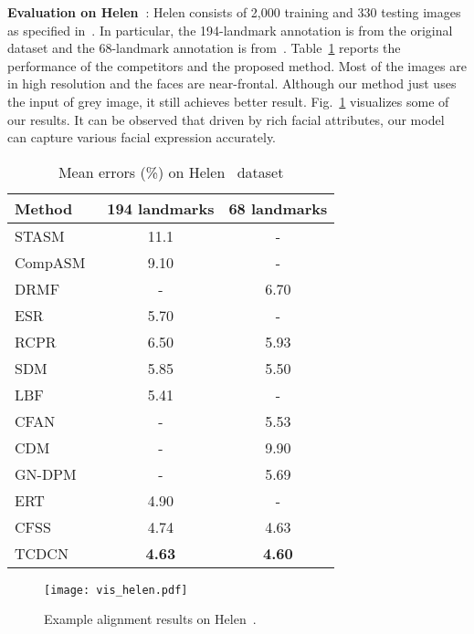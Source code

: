 \documentclass[10pt,journal,compsoc]{IEEEtran}
\begin{document}
\vspace{0.1cm}
\noindent\textbf{Evaluation on Helen~\cite{Helen}}: Helen consists of 2,000 training and 330 testing images as specified in~\cite{Helen}. In particular, the 194-landmark annotation is from the original dataset and the 68-landmark annotation is from~\cite{300w}. Table~\ref{tab:helen} reports the performance of the competitors and the proposed method. Most of the images are in high resolution and the faces are near-frontal. Although our method just uses the input of  grey image, it still achieves better result. Fig.~\ref{fig:visual_examples_helen} visualizes some of our results. It can be observed that driven by rich facial attributes, our model can capture various facial expression accurately.

\begin{table}[t]
\caption{Mean errors (\%) on Helen~\cite{Helen} dataset}
\vskip -0.5cm
\label{tab:helen}

\begin{center}
\begin{tabular}{l|c|c}
\hline
Method&194 landmarks&68 landmarks\\
\hline\hline
STASM~\cite{milborrow2008locating}&11.1&-\\
CompASM~\cite{Helen}&9.10&-\\
DRMF~\cite{asthana2013robust}&-&6.70\\
ESR~\cite{Cao2012}&5.70&-\\
RCPR~\cite{dollar13}&6.50&5.93\\
SDM~\cite{6618919}&5.85&5.50\\
LBF~\cite{300w_lbp}&5.41&-\\
CFAN~\cite{zhang2014coarse}&-&5.53\\
CDM~\cite{Yu2013}&-&9.90\\
GN-DPM~\cite{tzimiropoulos2014gauss}&-&5.69\\
ERT~\cite{kazemi2014one}&4.90&-\\
CFSS~\cite{zhu2015face}&4.74&4.63\\
TCDCN&\textbf{4.63}&\textbf{4.60}\\
\hline
\end{tabular}
\end{center}
\end{table}

\begin{figure}[t]
  \centering
  \texttt{[image: vis\_helen.pdf]}
  \vskip -0.3cm
  \caption{Example alignment results on Helen~\cite{Helen}.}
  \label{fig:visual_examples_helen}
  \vskip -0.3cm
\end{figure}
\end{document}

